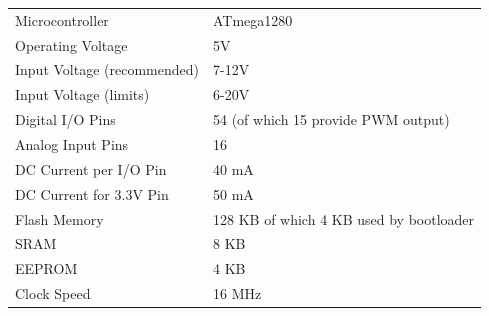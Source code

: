 \begin{table}
\begin{tabular}{| l | l |}
\hline
Microcontroller & ATmega1280\\
Operating Voltage & 5V\\
Input Voltage (recommended) & 7-12V\\
Input Voltage (limits) & 6-20V\\
Digital I/O Pins & 54 (of which 15 provide PWM output)\\
Analog Input Pins & 16\\
DC Current per I/O Pin & 40 mA\\
DC Current for 3.3V Pin & 50 mA\\
Flash Memory & 128 KB of which 4 KB used by bootloader\\
SRAM & 8 KB\\
EEPROM & 4 KB\\
Clock Speed & 16 MHz\\
\hline
\end{tabular}
\end{table}
\label{tab:megaspec}